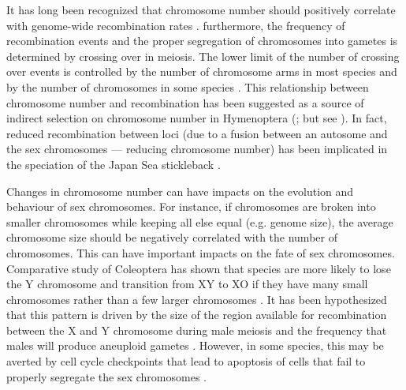 It has long been recognized that chromosome number should positively correlate with genome-wide recombination rates \citep{stebbins1958}.
furthermore, the frequency of recombination events and the proper segregation of chromosomes into gametes is determined by crossing over in meiosis.
The lower limit of the number of crossing over events is controlled by the number of chromosome arms in most species and by the number of chromosomes in some species \citep{dumont2017req}.
This relationship between chromosome number and recombination has been suggested as a source of indirect selection on chromosome number in Hymenoptera (\citealt{sherman1979}; but see \citealt{ross2015}).
In fact, reduced recombination between loci (due to a fusion between an autosome and the sex chromosomes --- reducing chromosome number) has been implicated in the speciation of the Japan Sea stickleback \citep{kitano2012}. 

Changes in chromosome number can have impacts on the evolution and behaviour of sex chromosomes. 
For instance, if chromosomes are broken into smaller chromosomes while keeping all else equal (e.g. genome size), the average chromosome size should be negatively correlated with the number of chromosomes.
This can have important impacts on the fate of sex chromosomes.
Comparative study of Coleoptera has shown that species are more likely to lose the Y chromosome and transition from XY to XO if they have many small chromosomes rather than a few larger chromosomes \citep{blackmon2015bioessay}.
It has been hypothesized that this pattern is driven by the size of the region available for recombination between the X and Y chromosome during male meiosis and the frequency that males will produce aneuploid gametes \citep{blackmon2014}.
However, in some species, this may be averted by cell cycle checkpoints that lead to apoptosis of cells that fail to properly segregate the sex chromosomes \citep{dumont2017par}.


